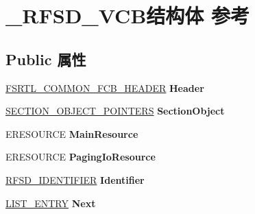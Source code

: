 \hypertarget{struct___r_f_s_d___v_c_b}{}\section{\+\_\+\+R\+F\+S\+D\+\_\+\+V\+C\+B结构体 参考}
\label{struct___r_f_s_d___v_c_b}
\subsection*{Public 属性}
\begin{DoxyCompactItemize}
\item 
\mbox{\label{struct___r_f_s_d___v_c_b_aca3e2775dbaf44df3232679eff4b5522}} 
\hyperlink{struct___f_s_r_t_l___c_o_m_m_o_n___f_c_b___h_e_a_d_e_r}{F\+S\+R\+T\+L\+\_\+\+C\+O\+M\+M\+O\+N\+\_\+\+F\+C\+B\+\_\+\+H\+E\+A\+D\+ER} {\bfseries Header}
\item 
\mbox{\label{struct___r_f_s_d___v_c_b_a725e7f75f24a7debac01c791f08ab7cc}} 
\hyperlink{struct___s_e_c_t_i_o_n___o_b_j_e_c_t___p_o_i_n_t_e_r_s}{S\+E\+C\+T\+I\+O\+N\+\_\+\+O\+B\+J\+E\+C\+T\+\_\+\+P\+O\+I\+N\+T\+E\+RS} {\bfseries Section\+Object}
\item 
\mbox{\label{struct___r_f_s_d___v_c_b_a4f0a46574dfd0625af04bd8fa35eab8c}} 
E\+R\+E\+S\+O\+U\+R\+CE {\bfseries Main\+Resource}
\item 
\mbox{\label{struct___r_f_s_d___v_c_b_a5c2add7b771e3c23c81d55f53a348577}} 
E\+R\+E\+S\+O\+U\+R\+CE {\bfseries Paging\+Io\+Resource}
\item 
\mbox{\label{struct___r_f_s_d___v_c_b_a80d827912c64c032fd951af92c4ccea9}} 
\hyperlink{struct___r_f_s_d___i_d_e_n_t_i_f_i_e_r}{R\+F\+S\+D\+\_\+\+I\+D\+E\+N\+T\+I\+F\+I\+ER} {\bfseries Identifier}
\item 
\mbox{\label{struct___r_f_s_d___v_c_b_a2b5f8c7e5f4ee844359d190937c406c8}} 
\hyperlink{struct___l_i_s_t___e_n_t_r_y}{L\+I\+S\+T\+\_\+\+E\+N\+T\+RY} {\bfseries Next}
\item 
\mbox{\label{struct___r_f_s_d___v_c_b_af96e715c815ae20a43da25ef8ef15620}} 

\end{DoxyCompactItemize}
